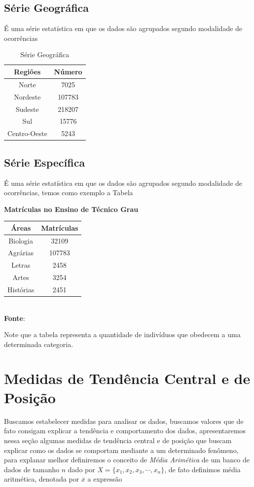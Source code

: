 \subsection{Série Geográfica}
\inic É uma série estatística em que os dados são agrupados segundo modalidade de ocorrências 
\begin{table}[H]
    \centering
    \caption{Série Geográfica}
    \label{tab:my_label}
    \begin{tabular}{cc}
		\hline
		Regiões & Número\\
		\hline
		Norte & 7025 \\
		Nordeste & 107783 \\
		Sudeste & 218207 \\
		Sul & 15776 \\
		Centro-Oeste & 5243 \\
		\hline
	\end{tabular}
\end{table}
\subsection{Série Específica}
\inic É uma série estatística em que os dados são agrupados segundo modalidade de ocorrências, temos como exemplo a Tabela 
	\begin{center}
		\textbf{Matrículas no Ensino de Técnico Grau} \\
		\begin{tabular}{cc}
			\hline
			Áreas & Matrículas\\
			\hline
			Biologia & 32109 \\
			Agrárias & 107783 \\
			Letras & 2458 \\
			Artes & 3254 \\
			Histórias & 2451\\
			\hline
		\end{tabular}
		\\
		\textbf{Fonte}: \cite{da1981curso}
	\end{center}
\inic Note que a tabela representa a quantidade de indivíduos que obedecem a uma determinada categoria.
\section{Medidas de Tendência Central e de Posição}
\inic Buscamos estabelecer medidas para analisar os dados, buscamos valores que de fato consigam explicar a tendência e comportamento dos dados, apresentaremos nessa seção algumas medidas de tendência central e de posição que buscam explicar como os dados se comportam mediante a um determinado fenômeno, para explanar melhor definiremos o conceito de \textit{Média Arimética} de um banco de dados de tamanho $n$ dado por $X = \{x_1,x_2,x_3,\cdots,x_n\}$, de fato definimos média aritmética, denotada por $\overline{x}$ a expressão

